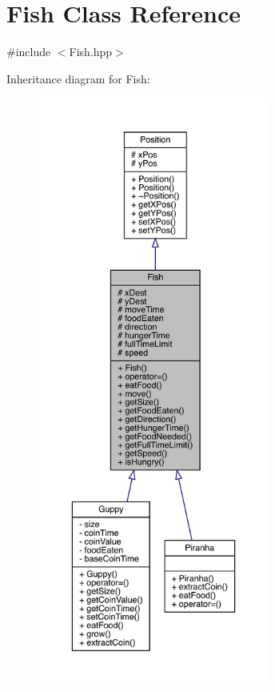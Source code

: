 \hypertarget{class_fish}{}\section{Fish Class Reference}
\label{class_fish}


{\ttfamily \#include $<$Fish.\+hpp$>$}



Inheritance diagram for Fish\+:
\nopagebreak
\begin{figure}[H]
\begin{center}
\leavevmode
\includegraphics[height=550pt]{class_fish__inherit__graph}
\end{center}
\end{figure}


